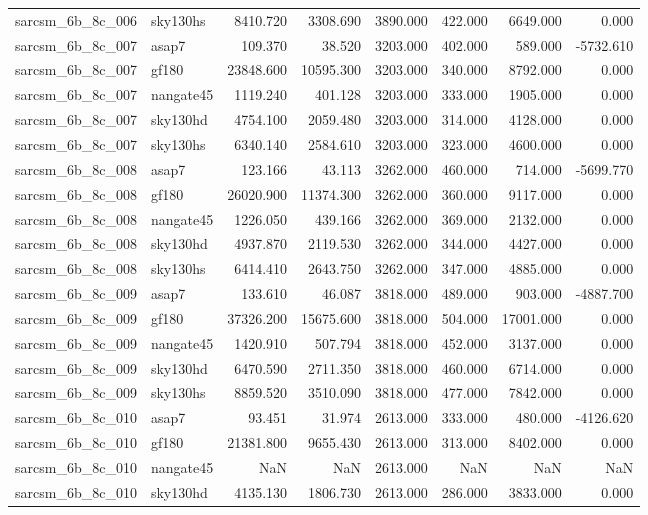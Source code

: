\begin{tabular}{llrrrrrr}
sarcsm\_6b\_8c\_006 & sky130hs & 8410.720 & 3308.690 & 3890.000 & 422.000 & 6649.000 & 0.000 \\
sarcsm\_6b\_8c\_007 & asap7 & 109.370 & 38.520 & 3203.000 & 402.000 & 589.000 & -5732.610 \\
sarcsm\_6b\_8c\_007 & gf180 & 23848.600 & 10595.300 & 3203.000 & 340.000 & 8792.000 & 0.000 \\
sarcsm\_6b\_8c\_007 & nangate45 & 1119.240 & 401.128 & 3203.000 & 333.000 & 1905.000 & 0.000 \\
sarcsm\_6b\_8c\_007 & sky130hd & 4754.100 & 2059.480 & 3203.000 & 314.000 & 4128.000 & 0.000 \\
sarcsm\_6b\_8c\_007 & sky130hs & 6340.140 & 2584.610 & 3203.000 & 323.000 & 4600.000 & 0.000 \\
sarcsm\_6b\_8c\_008 & asap7 & 123.166 & 43.113 & 3262.000 & 460.000 & 714.000 & -5699.770 \\
sarcsm\_6b\_8c\_008 & gf180 & 26020.900 & 11374.300 & 3262.000 & 360.000 & 9117.000 & 0.000 \\
sarcsm\_6b\_8c\_008 & nangate45 & 1226.050 & 439.166 & 3262.000 & 369.000 & 2132.000 & 0.000 \\
sarcsm\_6b\_8c\_008 & sky130hd & 4937.870 & 2119.530 & 3262.000 & 344.000 & 4427.000 & 0.000 \\
sarcsm\_6b\_8c\_008 & sky130hs & 6414.410 & 2643.750 & 3262.000 & 347.000 & 4885.000 & 0.000 \\
sarcsm\_6b\_8c\_009 & asap7 & 133.610 & 46.087 & 3818.000 & 489.000 & 903.000 & -4887.700 \\
sarcsm\_6b\_8c\_009 & gf180 & 37326.200 & 15675.600 & 3818.000 & 504.000 & 17001.000 & 0.000 \\
sarcsm\_6b\_8c\_009 & nangate45 & 1420.910 & 507.794 & 3818.000 & 452.000 & 3137.000 & 0.000 \\
sarcsm\_6b\_8c\_009 & sky130hd & 6470.590 & 2711.350 & 3818.000 & 460.000 & 6714.000 & 0.000 \\
sarcsm\_6b\_8c\_009 & sky130hs & 8859.520 & 3510.090 & 3818.000 & 477.000 & 7842.000 & 0.000 \\
sarcsm\_6b\_8c\_010 & asap7 & 93.451 & 31.974 & 2613.000 & 333.000 & 480.000 & -4126.620 \\
sarcsm\_6b\_8c\_010 & gf180 & 21381.800 & 9655.430 & 2613.000 & 313.000 & 8402.000 & 0.000 \\
sarcsm\_6b\_8c\_010 & nangate45 & NaN & NaN & 2613.000 & NaN & NaN & NaN \\
sarcsm\_6b\_8c\_010 & sky130hd & 4135.130 & 1806.730 & 2613.000 & 286.000 & 3833.000 & 0.000 \\

\end{tabular}
